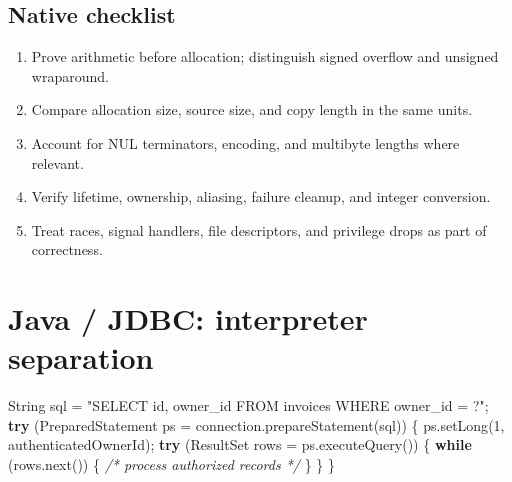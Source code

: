 \documentclass[
  letterpaper,
]{article}
\newenvironment{Shaded}{}{}
\newcommand{\BuiltInTok}[1]{\textcolor[rgb]{0.00,0.50,0.00}{#1}}
\newcommand{\CommentTok}[1]{\textcolor[rgb]{0.38,0.63,0.69}{\textit{#1}}}
\newcommand{\ControlFlowTok}[1]{\textcolor[rgb]{0.00,0.44,0.13}{\textbf{#1}}}
\newcommand{\DecValTok}[1]{\textcolor[rgb]{0.25,0.63,0.44}{#1}}
\newcommand{\FunctionTok}[1]{\textcolor[rgb]{0.02,0.16,0.49}{#1}}
\newcommand{\NormalTok}[1]{#1}
\newcommand{\OperatorTok}[1]{\textcolor[rgb]{0.40,0.40,0.40}{#1}}
\newcommand{\StringTok}[1]{\textcolor[rgb]{0.25,0.44,0.63}{#1}}
\providecommand{\tightlist}{%
  \setlength{\itemsep}{0pt}\setlength{\parskip}{0pt}}
\begin{document}
\subsection{Native checklist}\label{native-checklist}

\begin{enumerate}
\def\labelenumi{\arabic{enumi}.}
\tightlist
\item
  Prove arithmetic before allocation; distinguish signed overflow and
  unsigned wraparound.
\item
  Compare allocation size, source size, and copy length in the same
  units.
\item
  Account for NUL terminators, encoding, and multibyte lengths where
  relevant.
\item
  Verify lifetime, ownership, aliasing, failure cleanup, and integer
  conversion.
\item
  Treat races, signal handlers, file descriptors, and privilege drops as
  part of correctness.
\end{enumerate}

\section{Java / JDBC: interpreter
separation}\label{java-jdbc-interpreter-separation}

\begin{Shaded}
\begin{Highlighting}[]
\BuiltInTok{String}\NormalTok{ sql }\OperatorTok{=} \StringTok{"SELECT id, owner\_id FROM invoices WHERE owner\_id = ?"}\OperatorTok{;}
\ControlFlowTok{try} \OperatorTok{(}\BuiltInTok{PreparedStatement}\NormalTok{ ps }\OperatorTok{=}\NormalTok{ connection}\OperatorTok{.}\FunctionTok{prepareStatement}\OperatorTok{(}\NormalTok{sql}\OperatorTok{))} \OperatorTok{\{}
\NormalTok{    ps}\OperatorTok{.}\FunctionTok{setLong}\OperatorTok{(}\DecValTok{1}\OperatorTok{,}\NormalTok{ authenticatedOwnerId}\OperatorTok{);}
    \ControlFlowTok{try} \OperatorTok{(}\BuiltInTok{ResultSet}\NormalTok{ rows }\OperatorTok{=}\NormalTok{ ps}\OperatorTok{.}\FunctionTok{executeQuery}\OperatorTok{())} \OperatorTok{\{}
        \ControlFlowTok{while} \OperatorTok{(}\NormalTok{rows}\OperatorTok{.}\FunctionTok{next}\OperatorTok{())} \OperatorTok{\{} \CommentTok{/* process authorized records */} \OperatorTok{\}}
    \OperatorTok{\}}
\OperatorTok{\}}
\end{Highlighting}
\end{Shaded}
\end{document}
